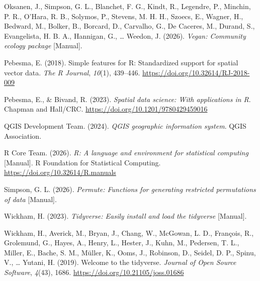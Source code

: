 \documentclass[
  american,
  11pt,
]{stylisharticle}
\newlength{\cslhangindent}
\newenvironment{CSLReferences}[2] %
 {\begin{list}{}{%
  \setlength{\itemindent}{0pt}
  \setlength{\leftmargin}{0pt}
  \setlength{\parsep}{0pt}
  \ifodd #1
   \setlength{\leftmargin}{\cslhangindent}
   \setlength{\itemindent}{-1\cslhangindent}
  \fi
  \setlength{\itemsep}{#2\baselineskip}}}
 {\end{list}}
\begin{document}
\begin{CSLReferences}{1}{0}
Oksanen, J., Simpson, G. L., Blanchet, F. G., Kindt, R., Legendre, P.,
Minchin, P. R., O'Hara, R. B., Solymos, P., Stevens, M. H. H., Szoecs,
E., Wagner, H., Bedward, M., Bolker, B., Borcard, D., Carvalho, G., De
Caceres, M., Durand, S., Evangelista, H. B. A., Hannigan, G., \ldots{}
Weedon, J. (2026). \emph{Vegan: {Community} ecology package}
{[}Manual{]}.

Pebesma, E. (2018). Simple features for {R}: {Standardized} support for
spatial vector data. \emph{The R Journal}, \emph{10}(1), 439--446.
\url{https://doi.org/10.32614/RJ-2018-009}

Pebesma, E., \& Bivand, R. (2023). \emph{Spatial data science: {With}
applications in {R}}. {Chapman and Hall/CRC}.
\url{https://doi.org/10.1201/9780429459016}

QGIS Development Team. (2024). \emph{{QGIS} geographic information
system}. QGIS Association.

R Core Team. (2026). \emph{R: A language and environment for statistical
computing} {[}Manual{]}. R Foundation for Statistical Computing.
\url{https://doi.org/10.32614/R.manuals}

Simpson, G. L. (2026). \emph{Permute: {Functions} for generating
restricted permutations of data} {[}Manual{]}.

Wickham, H. (2023). \emph{Tidyverse: {Easily} install and load the
tidyverse} {[}Manual{]}.

Wickham, H., Averick, M., Bryan, J., Chang, W., McGowan, L. D.,
François, R., Grolemund, G., Hayes, A., Henry, L., Hester, J., Kuhn, M.,
Pedersen, T. L., Miller, E., Bache, S. M., Müller, K., Ooms, J.,
Robinson, D., Seidel, D. P., Spinu, V., \ldots{} Yutani, H. (2019).
Welcome to the {tidyverse}. \emph{Journal of Open Source Software},
\emph{4}(43), 1686. \url{https://doi.org/10.21105/joss.01686}

\end{CSLReferences}
\end{document}
